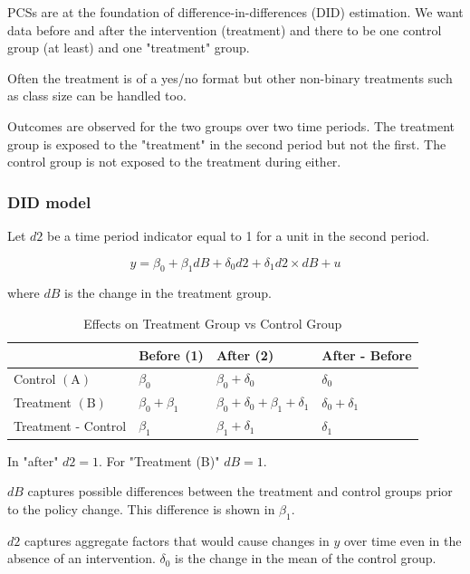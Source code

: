 \documentclass[11pt]{article}
\begin{document}
PCSs are at the foundation of difference-in-differences (DID) estimation. We want data before and after the intervention (treatment) and there to be one control group (at least) and one "treatment" group.

Often the treatment is of a yes/no format but other non-binary treatments such as class size can be handled too.

Outcomes are observed for the two groups over two time periods. The treatment group is exposed to the "treatment" in the second period but not the first. The control group is not exposed to the treatment during either.

\subsubsection{DID model}

Let $d2$ be a time period indicator equal to 1 for a unit in the second period.

\begin{equation}
    y = \beta_0 + \beta_1 dB + \delta_0 d2 + \delta_1 d2 \times dB + u
\end{equation}

where $dB$ is the change in the treatment group.

\begin{table}[h]
    \centering
    \begin{tabular}{|l|l|l|l|}
\hline & Before (1) & After (2) & After - Before \\
\hline Control $(\mathrm{A})$ & $\beta_0$ & $\beta_0+\delta_0$ & $\delta_0$ \\
\hline Treatment $(\mathrm{B})$ & $\beta_0+\beta_1$ & $\beta_0+\delta_0+\beta_1+\delta_1$ & $\delta_0+\delta_1$ \\
\hline Treatment - Control & $\beta_1$ & $\beta_1+\delta_1$ & $\delta_1$ \\
\hline
\end{tabular}
    \caption{Effects on Treatment Group vs Control Group}
    \label{tab:diff in diff}
\end{table}

In "after" $d2=1$. For "Treatment (B)" $dB=1$.

$dB$ captures possible differences between the treatment and control groups prior to the policy change. This difference is shown in $\beta_1$.

$d2$ captures aggregate factors that would cause changes in $y$ over time even in the absence of an intervention. $\delta_0$ is the change in the mean of the control group.
\end{document}
